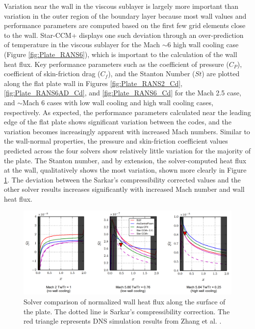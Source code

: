 \documentclass[journal ]{new-aiaa}
\begin{document}
Variation near the wall in the viscous sublayer is largely more important than variation in the outer region of the boundary layer because most wall values and performance parameters are computed based on the first few grid elements close to the wall. Star-CCM+ displays one such deviation through an over-prediction of temperature in the viscous sublayer for the Mach $\sim$6 high wall cooling case (Figure \ref{fig:Plate_RANS6}), which is important to the calculation of the wall heat flux.
Key performance parameters such as the coefficient of pressure ($C_P$), coefficient of skin-friction drag ($C_f$), and the Stanton Number ($St$) are plotted along the flat plate wall in Figures \ref{fig:Plate_RANS2_Cd},  \ref{fig:Plate_RANS6AD_Cd}, and \ref{fig:Plate_RANS6_Cd} for the Mach 2.5 case, and $\sim$Mach 6 cases with low wall cooling and high wall cooling cases, respectively. As expected, the performance parameters calculated near the leading edge of the flat plate shows significant variation between the codes, and the variation becomes increasingly apparent with increased Mach numbers. %
Similar to the wall-normal properties, the pressure and skin-friction coefficient values predicted across the four solvers show relatively little variation for the majority of the plate. The Stanton number, and by extension, the solver-computed heat flux at the wall, qualitatively shows the most variation, shown more clearly in Figure \ref{fig:Wallheatfluxplate}. The deviation between the Sarkar's compressibility corrected values and the other solver results increases significantly with increased Mach number and wall heat flux. 

\begin{figure}
\centering
    \includegraphics[width=\textwidth]{CHT/Wall_Heat_Flux.png}
  \caption{Solver comparison of normalized wall heat flux along the surface of the plate. The dotted line is Sarkar's compressibility correction. The red triangle represents DNS simulation results from Zhang et al. \cite{Zhang2018DNS}.}
  \label{fig:Wallheatfluxplate}
\end{figure}
\end{document}
